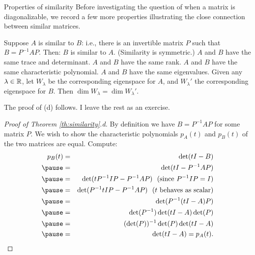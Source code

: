\begin{frame}{Properties of similarity}
Before investigating the question of when a matrix is diagonalizable, we record a few more properties illustrating the close connection between similar matrices. 
\begin{theorem}\label{th:similarity}
Suppose $A$ is similar to $B$: i.e., there is an invertible matrix $P$ such that $B=P^{-1}AP$. Then:
\bb[(a)]
\ii $B$ is similar to $A$. (\alert{Similarity is symmetric}.)
\ii $A$ and $B$ have the same trace and determinant. 
\ii $A$ and $B$ have the same rank. 
\ii $A$ and $B$ have the same characteristic polynomial.  
\ii $A$ and $B$ have the same eigenvalues. 
\ii Given any $\lambda\in{\mathbb R}$, let $W_\lambda$ be the corresponding eigenspace for $A$, and $W_\lambda'$ the corresponding eigenspace for $B$. Then $\dim W_{\lambda}=\dim W_{\lambda}'$. 
\ee
\end{theorem}
\pause The proof of (d) follows. I leave the rest as an exercise. 
\end{frame}
\begin{frame}
\begin{proof}[Proof of Theorem \ref{th:similarity}.d]
By definition we have $B=P^{-1}AP$ for some matrix $P$. We wish to show the characteristic polynomials $p_A(t)$ and $p_B(t)$ of the two matrices are equal. Compute:  
\begin{eqnarray*}
p_B(t)&=&\det(tI-B)\\
\pause &=&\det(tI-P^{-1}AP) \\
\pause &=&\det(tP^{-1}IP-P^{-1}AP) \ \text{ (since $P^{-1}IP=I$)} \\
\pause &=&\det(P^{-1}tIP-P^{-1}AP) \ \text{ ($t$ behaves as scalar)} \\
\pause &=&\det(P^{-1}(tI-A)P) \\
\pause &=&\det(P^{-1})\det(tI-A)\det(P)\\
\pause &=&(\det(P))^{-1}\det(P)\det(tI-A)\\
\pause &=&\det(tI-A)=p_A(t). 
\end{eqnarray*}
\end{proof}
\end{frame}
